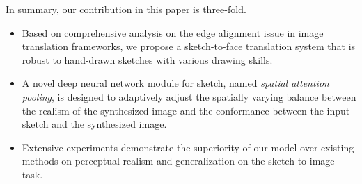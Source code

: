 In summary, our contribution in this paper is three-fold.
\begin{itemize}
\item Based on comprehensive analysis on the edge alignment issue in image translation frameworks, we propose a sketch-to-face translation system that is robust to hand-drawn sketches with various drawing skills. 
\item A novel deep neural network module for sketch, named \emph{spatial attention pooling}, is designed to adaptively adjust the spatially varying balance between the realism of the synthesized image and the conformance between the input sketch and the synthesized image.
\item Extensive experiments demonstrate the superiority of our model over existing methods on perceptual realism and generalization on the sketch-to-image task.
\end{itemize}